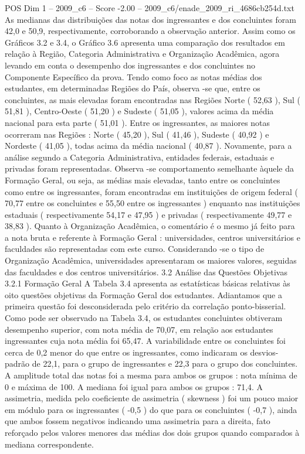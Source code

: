 \begin{textsample}{POS Dim 1 – 2009\_c6 – Score -2.00 – 2009\_c6/enade\_2009\_ri\_4686cb254d.txt}
As medianas das distribuições das notas dos ingressantes e dos concluintes foram 42,0 e 50,9, respectivamente, corroborando a observação anterior.
Assim como os Gráficos 3.2 e 3.4, o Gráfico 3.6 apresenta uma comparação dos resultados em relação à Região, Categoria Administrativa e Organização Acadêmica, agora levando em conta o desempenho dos ingressantes e dos concluintes no Componente Específico da prova.
Tendo como foco as notas médias dos estudantes, em determinadas Regiões do País, observa -se que, entre os concluintes, as mais elevadas foram encontradas nas Regiões Norte ( 52,63 ), Sul ( 51,81 ), Centro-Oeste ( 51,20 ) e Sudeste ( 51,05 ), valores acima da média nacional para esta parte ( 51,01 ).
Entre os ingressantes, as maiores notas ocorreram nas Regiões : Norte ( 45,20 ), Sul ( 41,46 ), Sudeste ( 40,92 ) e Nordeste ( 41,05 ), todas acima da média nacional ( 40,87 ).
Novamente, para a análise segundo a Categoria Administrativa, entidades federais, estaduais e privadas foram representadas.
Observa -se comportamento semelhante àquele da Formação Geral, ou seja, as médias mais elevadas, tanto entre os concluintes como entre os ingressantes, foram encontradas em instituições de origem federal ( 70,77 entre os concluintes e 55,50 entre os ingressantes ) enquanto nas instituições estaduais ( respectivamente 54,17 e 47,95 ) e privadas ( respectivamente 49,77 e 38,83 ).
Quanto à Organização Acadêmica, o comentário é o mesmo já feito para a nota bruta e referente à Formação Geral : universidades, centros universitários e faculdades são representadas com este curso.
Considerando -se o tipo de Organização Acadêmica, universidades apresentaram os maiores valores, seguidas das faculdades e dos centros universitários. 3.2 Análise das Questões Objetivas 3.2.1 Formação Geral A Tabela 3.4 apresenta as estatísticas básicas relativas às oito questões objetivas da Formação Geral dos estudantes.
Adiantamos que a primeira questão foi desconsiderada pelo critério da correlação ponto-bisserial.
Como pode ser observado na Tabela 3.4, os estudantes concluintes obtiveram desempenho superior, com nota média de 70,07, em relação aos estudantes ingressantes cuja nota média foi 65,47.
A variabilidade entre os concluintes foi cerca de 0,2 menor do que entre os ingressantes, como indicaram os desvios-padrão de 22,1, para o grupo de ingressantes e 22,3 para o grupo dos concluintes.
A amplitude total das notas foi a mesma para ambos os grupos : nota mínima de 0 e máxima de 100.
A mediana foi igual para ambos os grupos : 71,4.
A assimetria, medida pelo coeficiente de assimetria ( skewness ) foi um pouco maior em módulo para os ingressantes ( -0,5 ) do que para os concluintes ( -0,7 ), ainda que ambos fossem negativos indicando uma assimetria para a direita, fato reforçado pelos valores menores das médias dos dois grupos quando comparados à mediana correspondente.

\end{textsample}
